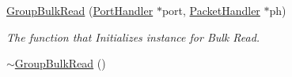 \begin{DoxyCompactItemize}
\item 
\hyperlink{classmercury_1_1_group_bulk_read_a068e0308d6e8b6b62a35c9ab990771bb}{Group\+Bulk\+Read} (\hyperlink{classmercury_1_1_port_handler}{Port\+Handler} $\ast$port, \hyperlink{classmercury_1_1_packet_handler}{Packet\+Handler} $\ast$ph)
\begin{DoxyCompactList}\small\item\em The function that Initializes instance for Bulk Read. \end{DoxyCompactList}\item 
\hyperlink{classmercury_1_1_group_bulk_read_adc97370dd1e953132e9ef39bf480c112}{$\sim$\+Group\+Bulk\+Read} ()\hypertarget{classmercury_1_1_group_bulk_read_adc97370dd1e953132e9ef39bf480c112}{}\label{classmercury_1_1_group_bulk_read_adc97370dd1e953132e9ef39bf480c112}


\end{DoxyCompactItemize}
